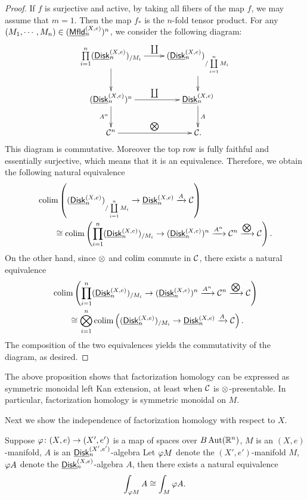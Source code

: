 \documentclass[twoside]{article}
\begin{document}
\begin{proof}
    If $f$ is surjective and active, by taking all fibers of the map $f$,
    we may assume that $m=1$. Then the map $f_*$ is the $n$-fold tensor product.
    For any $(M_1,\cdots,M_n)\in(\underline{\smash{\mathsf{Mfld}}}_n^{(X,e)})^n$, we consider the following 
    diagram:
    $$\xymatrix{\prod\limits_{i=1}^n(\Disk_n^{(X,e)})_{/M_i}\ar[r]^{\coprod}\ar[d]
    &(\Disk_n^{(X,e)})_{/\coprod\limits_{i=1}^nM_i}\ar[d]\\(\Disk_n^{(X,e)})^n
    \ar[r]^{\coprod}\ar[d]_{A^n}&\Disk_n^{(X,e)}\ar[d]^A\\\mathcal C^n
    \ar[r]^{\bigox}&\mathcal C.}$$
    This diagram is commutative. Moreover the top row is fully faithful and
    essentially surjective, which means that it is an equivalence. Therefore, 
    we obtain the following natural equivalence $$\begin{aligned}&\mathop{\operatorname{colim}}\left((\underline{\smash{\mathsf{Disk}}}_n^{(X,e)})
    _{/\coprod\limits_{i=1}^nM_i}\to\underline{\smash{\mathsf{Disk}}}_n^{(X,e)}\xrightarrow{A}\mathcal C\right)
    \\&\hspace{2em}\cong\mathop{\operatorname{colim}}\left(\prod_{i=1}^n(\underline{\smash{\mathsf{Disk}}}_n^{(X,e)})_{/M_i}\to
    (\underline{\smash{\mathsf{Disk}}}_n^{(X,e)})^n\xrightarrow{A^n}\mathcal C^n\xrightarrow{\bigotimes\limits}
    \mathcal C\right).\end{aligned}$$ On the other hand, since $\otimes$ and $\mathop{\operatorname{colim}}$ commute
    in $\cal C$, there exists a natural equivalence $$\begin{aligned}&\mathop{\operatorname{colim}}\left(\prod_{i=1}^n
    (\underline{\smash{\mathsf{Disk}}}_n^{(X,e)})_{/M_i}\to(\underline{\smash{\mathsf{Disk}}}_n^{(X,e)})^n\xrightarrow{A^n}\mathcal C^n
    \xrightarrow{\bigotimes\limits}\mathcal C\right)\\&\hspace{2em}\cong\bigotimes\limits_{i=1}^n\mathop{\operatorname{colim}}
    \left((\underline{\smash{\mathsf{Disk}}}_n^{(X,e)})_{/M_i}\to\underline{\smash{\mathsf{Disk}}}_n^{(X,e)}\xrightarrow{A}\mathcal C\right).\end{aligned}$$
    The composition of the two equivalences yields the commutativity of the diagram,
    as desired.
\end{proof}

The above proposition shows that factorization homology can be expressed as
symmetric monoidal left Kan extension, at least when $\cal C$ is
$\otimes$-presentable. In particular, factorization homology is symmetric monoidal
on $M$.

Next we show the independence of factorization homology with respect to $X$.

\begin{proposition}
    Suppose $\varphi\colon(X,e)\to(X',e')$ is a map of spaces over $B\operatorname{Aut}(\mathbb{R}^n)$, $M$ is an
    $(X,e)$-manifold, $A$ is an $\underline{\smash{\mathsf{Disk}}}_n^{(X',e')}$-algebra Let $\varphi M$ denote the
    $(X',e')$-manifold $M$, $\varphi A$ denote the $\underline{\smash{\mathsf{Disk}}}_n^{(X,e)}$-algebra $A$,
    then there exists a natural equivalence $$\int_{\varphi M}A\cong\int_M\varphi A.$$
\end{proposition}
\end{document}
